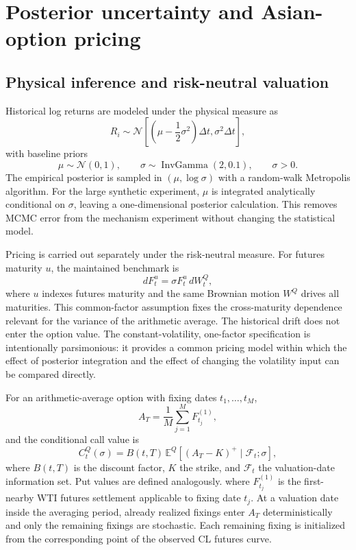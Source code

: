 \section{Posterior uncertainty and Asian-option pricing}\label{sec:short_method}

\subsection{Physical inference and risk-neutral valuation}

Historical log returns are modeled under the physical measure as
\begin{equation}
 R_i\sim
 \mathcal N\!\left[
 \left(\mu-\frac12\sigma^2\right)\Delta t,
 \sigma^2\Delta t
 \right],
 \label{eq:short_returns}
\end{equation}
with baseline priors
\begin{equation}
 \mu\sim\mathcal N(0,1),
 \qquad
 \sigma\sim\operatorname{InvGamma}(2,0.1),
 \qquad \sigma>0.
 \label{eq:short_priors}
\end{equation}
The empirical posterior is sampled in \((\mu,\log\sigma)\) with a random-walk Metropolis algorithm. For the large synthetic experiment, \(\mu\) is integrated analytically conditional on \(\sigma\), leaving a one-dimensional posterior calculation. This removes MCMC error from the mechanism experiment without changing the statistical model.

Pricing is carried out separately under the risk-neutral measure. For futures maturity \(u\), the maintained benchmark is
\begin{equation}
 dF_t^u=\sigma F_t^u\,dW_t^Q,
 \label{eq:short_q}
\end{equation}
where \(u\) indexes futures maturity and the same Brownian motion \(W^Q\) drives all maturities. This common-factor assumption fixes the cross-maturity dependence relevant for the variance of the arithmetic average. The historical drift does not enter the option value. The constant-volatility, one-factor specification is intentionally parsimonious: it provides a common pricing model within which the effect of posterior integration and the effect of changing the volatility input can be compared directly.

For an arithmetic-average option with fixing dates \(t_1,\ldots,t_M\),
\begin{equation}
 A_T=\frac{1}{M}\sum_{j=1}^M F^{(1)}_{t_j},
 \label{eq:short_average}
\end{equation}
and the conditional call value is
\begin{equation}
 C_t^Q(\sigma)
 =
 B(t,T)\,
 \mathbb E^Q\!\left[
 (A_T-K)^+\mid\mathcal F_t;\sigma
 \right],
 \label{eq:short_call_value}
\end{equation}
where \(B(t,T)\) is the discount factor, \(K\) the strike, and \(\mathcal F_t\) the valuation-date information set. Put values are defined analogously.
where \(F^{(1)}_{t_j}\) is the first-nearby WTI futures settlement applicable to fixing date \(t_j\). At a valuation date inside the averaging period, already realized fixings enter \(A_T\) deterministically and only the remaining fixings are stochastic. Each remaining fixing is initialized from the corresponding point of the observed CL futures curve.

